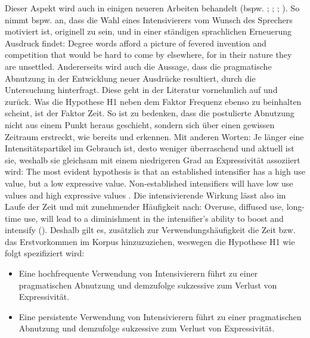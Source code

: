 \noindent Dieser Aspekt wird auch in einigen neueren Arbeiten behandelt (bspw. \citealt[]{Bolinger.1972}; \citealt[]{Ito.2003}; \citealt[]{Tagliamonte.2008}; {\citealt[]{Stratton.2020d,Stratton.2022a}}). So nimmt \citet[18]{Bolinger.1972} bspw. an, dass die Wahl eines Intensivierers vom Wunsch des Sprechers motiviert ist, originell zu sein, und in einer ständigen sprachlichen Erneuerung Ausdruck findet: \glqq{}Degree words afford a picture of fevered invention and competition that would be hard to come by elsewhere, for in their nature they are unsettled.\grqq{} Andererseits wird auch die Aussage, dass die pragmatische Abnutzung in der Entwicklung neuer Ausdrücke resultiert, durch die Untersuchung hinterfragt. Diese geht in der Literatur vornehmlich auf {\citet[]{Becher.1907}} und {\citet[]{Baumgarten.1908}} zurück. Was die {Hypothese H1} neben dem Faktor Frequenz ebenso zu beinhalten scheint, ist der Faktor Zeit. So ist zu bedenken, dass die postulierte Abnutzung nicht aus einem Punkt heraus geschieht, sondern sich über einen gewissen Zeitraum erstreckt, wie bereits {\citet[]{Tobler.1868}} und {\citet[]{Gabelentz.2016}} erkennen. Mit anderen Worten: Je länger eine Intensitätspartikel im Gebrauch ist, desto weniger überraschend und aktuell ist sie, weshalb sie gleichsam mit einem niedrigeren Grad an Expressivität assoziiert wird: \glqq{}The most evident hypothesis is that an established intensifier has a high use value, but a low expressive value. Non-established intensifiers will have low use values and high expressive values\grqq{} \citep[346f.]{Richter.2020}. Die intensivierende Wirkung lässt also im Laufe der Zeit und mit zunehmender Häufigkeit nach: \glqq{}Overuse, diffused use, long-time use, will lead to a diminishment in the intensifier’s ability to boost and intensify\grqq{} ({\citealt[391]{Tagliamonte.2008}}). Deshalb gilt es, zusätzlich zur Verwendungshäufigkeit die Zeit bzw. das Erstvorkommen im Korpus hinzuzuziehen, weswegen die Hypothese H1 wie folgt spezifiziert wird:

\begin{itemize} 
\setlength{\itemindent}{1cm}
\item[\textbf{\textsc{H1-Freq}}] Eine hochfrequente Verwendung von Intensivierern führt zu einer pragmatischen Abnutzung und demzufolge sukzessive zum Verlust von Expressivität. 

\item[\textbf{\textsc{H1-Temp}}] Eine persistente Verwendung von Intensivierern führt zu einer pragmatischen Abnutzung und demzufolge sukzessive zum Verlust von Expressivität. 
\end{itemize}

